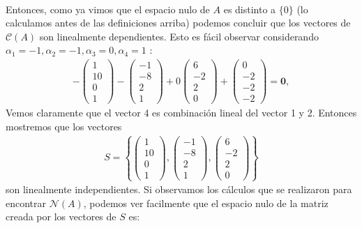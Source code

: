 \documentclass[11pt,letterpaper]{article}
\begin{document}
\begin{enumerate}
\begin{align*}
\end{align*}
Entonces, como ya vimos que el espacio nulo de $A$ es distinto a $\{ 0\}$ (lo calculamos antes de las definiciones arriba) podemos concluir que los vectores de $\mathcal{C}(A)$ son linealmente dependientes. Esto es fácil observar considerando $\alpha_1=-1, \alpha_2=-1, \alpha_3=0, \alpha_4=1$ :
\begin{align*}
-\begin{pmatrix}
1\\
10\\
0\\
1
\end{pmatrix}-\begin{pmatrix}
-1\\
-8\\
2\\
1
\end{pmatrix}+0\begin{pmatrix}
6\\
-2\\
2\\
0
\end{pmatrix}+\begin{pmatrix}
0\\
-2\\
-2\\
-2
\end{pmatrix} =\textbf{0},
\end{align*}
Vemos claramente que el vector 4 es combinación lineal del vector 1 y 2. Entonces mostremos que los vectores \begin{align*}
S=\left\{\begin{pmatrix}
1\\
10\\
0\\
1
\end{pmatrix},\begin{pmatrix}
-1\\
-8\\
2\\
1
\end{pmatrix},\begin{pmatrix}
6\\
-2\\
2\\
0
\end{pmatrix}
\right\}
\end{align*}
son linealmente independientes. Si observamos los cálculos que se realizaron para encontrar $\mathcal{N}(A)$, podemos ver facilmente que el espacio nulo de la matriz creada por los vectores de $S$ es:

\end{enumerate}
\end{document}
